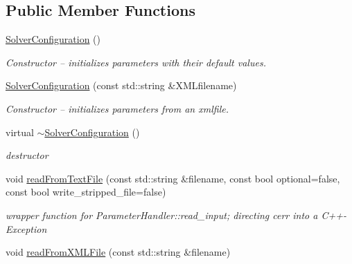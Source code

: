 \subsection*{Public Member Functions}
\begin{DoxyCompactItemize}
\item 
\hypertarget{classnatrium_1_1SolverConfiguration_a9aa7109e2eac9b8a7b424a35509ccdb0}{\hyperlink{classnatrium_1_1SolverConfiguration_a9aa7109e2eac9b8a7b424a35509ccdb0}{Solver\-Configuration} ()}\label{classnatrium_1_1SolverConfiguration_a9aa7109e2eac9b8a7b424a35509ccdb0}

\begin{DoxyCompactList}\small\item\em Constructor -- initializes parameters with their default values. \end{DoxyCompactList}\item 
\hyperlink{classnatrium_1_1SolverConfiguration_a062fa86eca607f830540ef4f2c06f0b3}{Solver\-Configuration} (const std\-::string \&X\-M\-Lfilename)
\begin{DoxyCompactList}\small\item\em Constructor -- initializes parameters from an xmlfile. \end{DoxyCompactList}\item 
\hypertarget{classnatrium_1_1SolverConfiguration_ac1b521d8c205b8774dbb7c038304336d}{virtual \hyperlink{classnatrium_1_1SolverConfiguration_ac1b521d8c205b8774dbb7c038304336d}{$\sim$\-Solver\-Configuration} ()}\label{classnatrium_1_1SolverConfiguration_ac1b521d8c205b8774dbb7c038304336d}

\begin{DoxyCompactList}\small\item\em destructor \end{DoxyCompactList}\item 
\hypertarget{classnatrium_1_1SolverConfiguration_a2900baca8d49d3a1d48926b8c8c39b71}{void \hyperlink{classnatrium_1_1SolverConfiguration_a2900baca8d49d3a1d48926b8c8c39b71}{read\-From\-Text\-File} (const std\-::string \&filename, const bool optional=false, const bool write\-\_\-stripped\-\_\-file=false)}\label{classnatrium_1_1SolverConfiguration_a2900baca8d49d3a1d48926b8c8c39b71}

\begin{DoxyCompactList}\small\item\em wrapper function for Parameter\-Handler\-::read\-\_\-input; directing cerr into a C++-\/\-Exception \end{DoxyCompactList}\item 
\hypertarget{classnatrium_1_1SolverConfiguration_a18c63509007270fa96212fef36a2c172}{void \hyperlink{classnatrium_1_1SolverConfiguration_a18c63509007270fa96212fef36a2c172}{read\-From\-X\-M\-L\-File} (const std\-::string \&filename)}\label{classnatrium_1_1SolverConfiguration_a18c63509007270fa96212fef36a2c172}


\end{DoxyCompactItemize}
